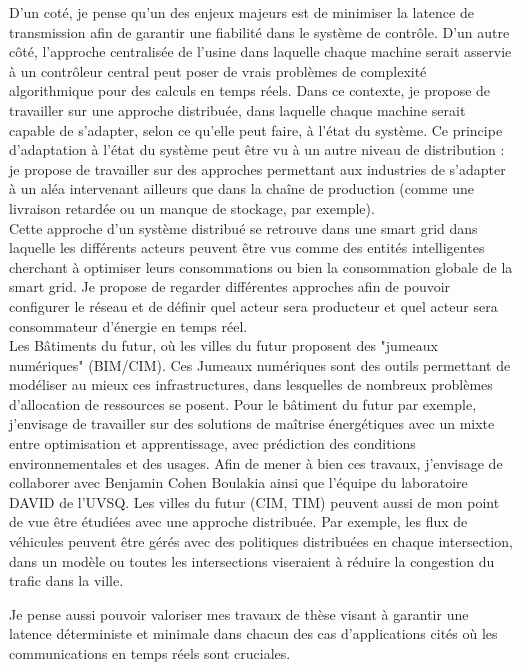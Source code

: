 \documentclass[a4paper,10pt]{article}
\begin{document}
 D'un coté, je pense qu'un des enjeux majeurs est de minimiser la latence de transmission afin de garantir une fiabilité dans le système de contrôle. D'un autre côté, l'approche centralisée de l'usine dans laquelle chaque machine serait asservie à un contrôleur central peut poser de vrais problèmes de complexité algorithmique pour des calculs en temps réels. Dans ce contexte, je propose de travailler sur une approche distribuée, dans laquelle chaque machine serait capable de s'adapter, selon ce qu'elle peut faire, à l'état du système.
Ce principe d'adaptation à l'état du système peut être vu à un autre niveau de distribution : je propose de travailler sur des approches permettant aux industries de s'adapter à un aléa intervenant ailleurs que dans la chaîne de production (comme une livraison retardée ou un manque de stockage, par exemple).\\
\newline
Cette approche d'un système distribué se retrouve dans une smart grid dans laquelle les différents acteurs peuvent être vus comme des entités intelligentes cherchant à optimiser leurs consommations ou bien la consommation globale de la smart grid. Je propose de regarder différentes approches afin de pouvoir configurer le réseau et de définir quel acteur sera producteur et quel acteur sera consommateur d'énergie en temps réel.\\
\newline
Les Bâtiments du futur, où les villes du futur proposent des "jumeaux numériques" (BIM/CIM). Ces Jumeaux numériques sont des outils permettant de modéliser au mieux ces infrastructures, dans lesquelles de nombreux problèmes d'allocation de ressources se posent. Pour le bâtiment du futur par exemple, j'envisage de travailler sur des solutions de maîtrise énergétiques avec un mixte entre optimisation et apprentissage, avec prédiction des conditions environnementales et des usages. Afin de mener à bien ces travaux, j'envisage de collaborer avec Benjamin Cohen Boulakia ainsi que l'équipe du laboratoire DAVID de l'UVSQ. Les villes du futur (CIM, TIM) peuvent aussi de mon point de vue être étudiées avec une approche distribuée. Par exemple, les flux de véhicules peuvent être gérés avec des politiques distribuées en chaque intersection, dans un modèle ou toutes les intersections viseraient à réduire la congestion du trafic dans la ville.


Je pense aussi pouvoir valoriser mes travaux de thèse visant à garantir une latence déterministe et minimale dans chacun des cas d'applications cités où les communications en temps réels sont cruciales. 
\end{document}
